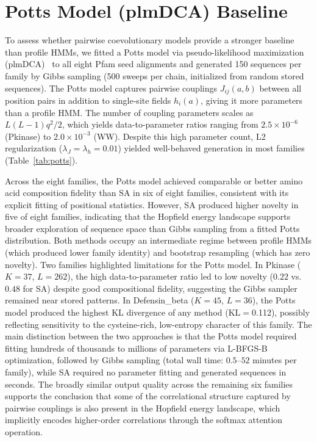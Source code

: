 \section{Potts Model (plmDCA) Baseline}\label{si:potts}

To assess whether pairwise coevolutionary models provide a stronger baseline than profile HMMs, we fitted a Potts model via pseudo-likelihood maximization (plmDCA)~\cite{ekeberg2013improved} to all eight Pfam seed alignments and generated 150 sequences per family by Gibbs sampling (500 sweeps per chain, initialized from random stored sequences). The Potts model captures pairwise couplings $J_{ij}(a,b)$ between all position pairs in addition to single-site fields $h_i(a)$, giving it more parameters than a profile HMM. The number of coupling parameters scales as $L(L{-}1)q^2/2$, which yields data-to-parameter ratios ranging from $2.5 \times 10^{-6}$ (Pkinase) to $2.0 \times 10^{-3}$ (WW). Despite this high parameter count, L2 regularization ($\lambda_J{=}\lambda_h{=}0.01$) yielded well-behaved generation in most families (Table~\ref{tab:potts}).

Across the eight families, the Potts model achieved comparable or better amino acid composition fidelity than SA in six of eight families, consistent with its explicit fitting of positional statistics. However, SA produced higher novelty in five of eight families, indicating that the Hopfield energy landscape supports broader exploration of sequence space than Gibbs sampling from a fitted Potts distribution. Both methods occupy an intermediate regime between profile HMMs (which produced lower family identity) and bootstrap resampling (which has zero novelty). Two families highlighted limitations for the Potts model. In Pkinase ($K{=}37$, $L{=}262$), the high data-to-parameter ratio led to low novelty ($0.22$ vs.\ $0.48$ for SA) despite good compositional fidelity, suggesting the Gibbs sampler remained near stored patterns. In Defensin\_beta ($K{=}45$, $L{=}36$), the Potts model produced the highest KL divergence of any method (KL$=$0.112), possibly reflecting sensitivity to the cysteine-rich, low-entropy character of this family. The main distinction between the two approaches is that the Potts model required fitting hundreds of thousands to millions of parameters via L-BFGS-B optimization, followed by Gibbs sampling (total wall time: $0.5$--$52$ minutes per family), while SA required no parameter fitting and generated sequences in seconds. The broadly similar output quality across the remaining six families supports the conclusion that some of the correlational structure captured by pairwise couplings is also present in the Hopfield energy landscape, which implicitly encodes higher-order correlations through the softmax attention operation.

